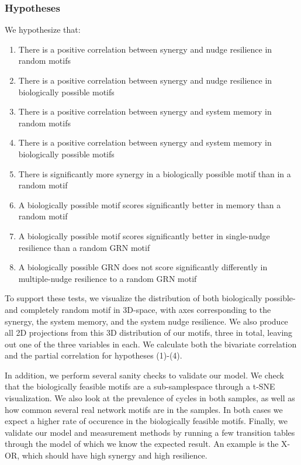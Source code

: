 \documentclass[../main.tex]{subfiles}
\begin{document}
\subsubsection{Hypotheses}

We hypothesize that:

\begin{enumerate}
\itemsep0em 
\item There is a positive correlation between synergy and nudge resilience in random motifs
\item There is a positive correlation between synergy and nudge resilience in biologically possible motifs
\item There is a positive correlation between synergy and system memory in random motifs
\item There is a positive correlation between synergy and system memory in biologically possible motifs
\item There is significantly more synergy in a biologically possible motif than in a random motif
\item A biologically possible motif scores significantly better in memory than a random motif
\item A biologically possible motif scores significantly better in single-nudge resilience than a random GRN motif
\item A biologically possible GRN does not score significantly differently in multiple-nudge resilience to a random GRN motif
\end{enumerate}

To support these tests, we visualize the distribution of both biologically possible- and completely random motif in 3D-space, with axes corresponding to the synergy, the system memory, and the system nudge resilience.
We also produce all 2D projections from this 3D distribution of our motifs, three in total, leaving out one of the three variables in each.
We calculate both the bivariate correlation and the partial correlation for hypotheses (1)-(4).

In addition, we perform several sanity checks to validate our model.
We check that the biologically feasible motifs are a sub-samplespace through a t-SNE visualization.
We also look at the prevalence of cycles in both samples, as well as how common several real network motifs are in the samples.
In both cases we expect a higher rate of occurence in the biologically feasible motifs.
Finally, we validate our model and measurement methods by running a few transition tables through the model of which we know the expected result.
An example is the X-OR, which should have high synergy and high resilience.
\end{document}

